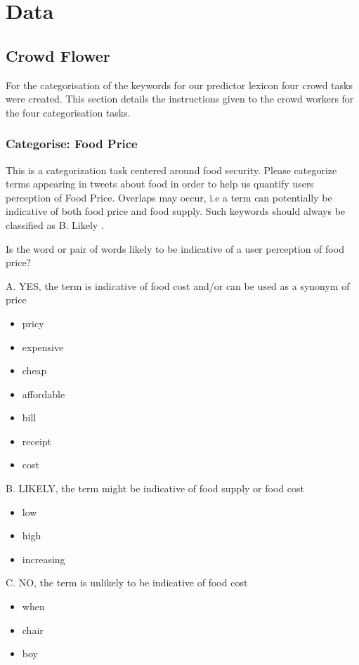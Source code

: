 \chapter{Data}



\section{Crowd Flower}

For the categorisation of the keywords for our predictor lexicon four crowd tasks were created. This section details the instructions given to the crowd workers for the four categorisation tasks. 

\subsection{Categorise: Food Price}

This is a categorization task centered around food security. Please categorize terms appearing in tweets about food in order to help us quantify users perception of Food Price. Overlaps may occur, i.e a term can potentially be indicative of both food price and food supply. Such keywords should always be classified as B. Likely .

Is the word or pair of words likely to be indicative of a user perception of food price?

A. YES, the term is indicative of food cost and/or can be used as a synonym of price

\begin{itemize}

  \item pricy 
  \item expensive 
  \item cheap 
  \item affordable 
  \item bill 
  \item receipt 
  \item cost 
\end{itemize}


B. LIKELY, the term might be indicative of food supply or food cost
\begin{itemize}
  \item low
  \item high 
  \item increasing 
\end{itemize}


C. NO, the term is unlikely to be indicative of food cost 
\begin{itemize}
  \item when
  \item chair
  \item boy
\end{itemize}


